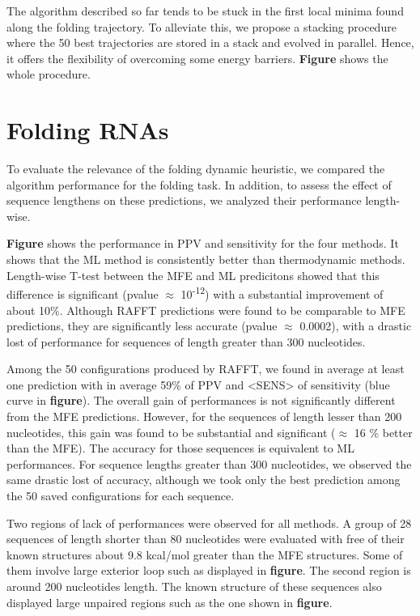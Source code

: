 \documentclass[a4paper,12pt]{article}
\begin{document}
{{The algorithm described so far tends to be stuck in the first local minima found
along the folding trajectory. To alleviate this, we propose a stacking procedure
where the 50 best trajectories are stored in a stack and evolved in parallel.
Hence, it offers the flexibility of overcoming some energy barriers. \textbf{Figure}
shows the whole procedure.

\section{Folding RNAs}
\label{sec:orgb7ca96f}
To evaluate the relevance of the folding dynamic heuristic, we compared the
algorithm performance for the folding task. In addition, to assess the effect of
sequence lengthens on these predictions, we analyzed their performance
length-wise.

\textbf{Figure} shows the performance in PPV and sensitivity for the four methods. It
shows that the ML method is consistently better than thermodynamic methods.
Length-wise T-test between the MFE and ML predicitons showed that this
difference is significant (pvalue \(\approx\) 10\textsuperscript{-12}) with a substantial
improvement of about 10\%. Although RAFFT predictions were found to be comparable
to MFE predictions, they are significantly less accurate (pvalue \(\approx\)
0.0002), with a drastic lost of performance for sequences of length greater than
300 nucleotides.

Among the 50 configurations produced by RAFFT, we found in average at least one
prediction with in average 59\% of PPV and <SENS> of sensitivity (blue curve in
\textbf{figure}). The overall gain of performances is not significantly different from
the MFE predictions. However, for the sequences of length lesser than 200
nucleotides, this gain was found to be substantial and significant (\(\approx\) 16 \%
better than the MFE). The accuracy for those sequences is equivalent to ML
performances. For sequence lengths greater than 300 nucleotides, we observed the
same drastic lost of accuracy, although we took only the best prediction among
the 50 saved configurations for each sequence.

Two regions of lack of performances were observed for all methods. A group of 28
sequences of length shorter than 80 nucleotides were evaluated with free of
their known structures about 9.8 kcal/mol greater than the MFE structures. Some
of them involve large exterior loop such as displayed in \textbf{figure}. The second
region is around 200 nucleotides length. The known structure of these sequences
also displayed large unpaired regions such as the one shown in \textbf{figure}.

}}
\end{document}
